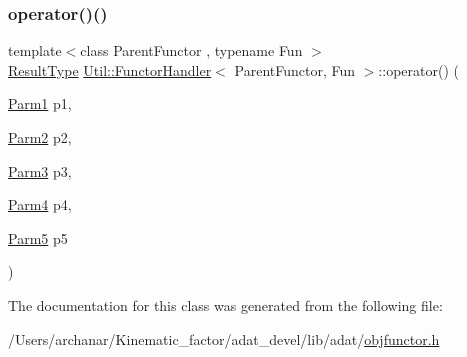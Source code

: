 \subsubsection{\texorpdfstring{operator()()}{operator()()}\hspace{0.1cm}{\footnotesize\ttfamily [12/12]}}
{\footnotesize\ttfamily template$<$class Parent\+Functor , typename Fun $>$ \\
\mbox{\hyperlink{classUtil_1_1FunctorHandler_a036da44b8cc2567704cebd2a20d16c80}{Result\+Type}} \mbox{\hyperlink{classUtil_1_1FunctorHandler}{Util\+::\+Functor\+Handler}}$<$ Parent\+Functor, Fun $>$\+::operator() (\begin{DoxyParamCaption}\item[{\mbox{\hyperlink{classUtil_1_1FunctorHandler_a0a902ba40a0ab746f1c29a81d68ae0db}{Parm1}}}]{p1,  }\item[{\mbox{\hyperlink{classUtil_1_1FunctorHandler_a5fb5374c316f8ac252aa22fcdf7d21a7}{Parm2}}}]{p2,  }\item[{\mbox{\hyperlink{classUtil_1_1FunctorHandler_a25f1b9dd7890c1dbc68abc686f30bec8}{Parm3}}}]{p3,  }\item[{\mbox{\hyperlink{classUtil_1_1FunctorHandler_a2e8ca7556b379684e9b76029e77dd644}{Parm4}}}]{p4,  }\item[{\mbox{\hyperlink{classUtil_1_1FunctorHandler_aeb1492d58534bb15702063e862e459c6}{Parm5}}}]{p5 }\end{DoxyParamCaption})\hspace{0.3cm}{\ttfamily [inline]}}



The documentation for this class was generated from the following file\+:\begin{DoxyCompactItemize}
\item 
/\+Users/archanar/\+Kinematic\+\_\+factor/adat\+\_\+devel/lib/adat/\mbox{\hyperlink{lib_2adat_2objfunctor_8h}{objfunctor.\+h}}\end{DoxyCompactItemize}
